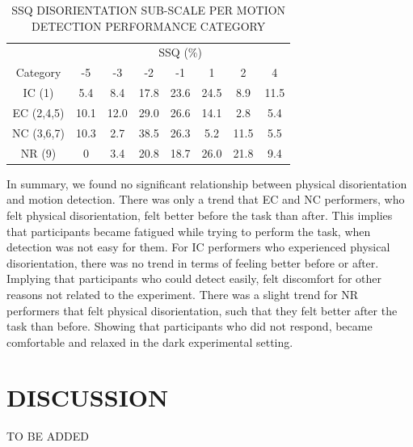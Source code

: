 \documentclass{ieeeaccess}
\begin{document}
\begin{table}[h!]
\caption{SSQ DISORIENTATION SUB-SCALE PER MOTION DETECTION PERFORMANCE CATEGORY}
\label{table3}
\centering
\begin{tabular}{c|ccccccc}
\hline
& \multicolumn{7}{c}{\centering SSQ (\%)}\\
Category & -5 & -3 & -2 & -1 & 1 & 2 & 4\\
\hline
IC (1) & 5.4 & 8.4 & 17.8 & 23.6 & 24.5 & 8.9 & 11.5\\
EC (2,4,5) & 10.1 & 12.0 & 29.0 & 26.6 & 14.1 & 2.8 & 5.4\\
NC (3,6,7) & 10.3 & 2.7 & 38.5 & 26.3 & 5.2 & 11.5 & 5.5\\
NR (9) & 0 & 3.4 & 20.8 & 18.7 & 26.0 & 21.8 & 9.4\\
\hline
\end{tabular}
\end{table}

\indent In summary, we found no significant relationship between physical disorientation and motion detection. There was only a trend that EC and NC performers, who felt physical disorientation, felt better before the task than after. This implies that participants became fatigued while trying to perform the task, when detection was not easy for them. For IC performers who experienced physical disorientation, there was no trend in terms of feeling better before or after. Implying that participants who could detect easily, felt discomfort for other reasons not related to the experiment. There was a slight trend for NR performers that felt physical disorientation, such that they felt better after the task than before. Showing that participants who did not respond, became comfortable and relaxed in the dark experimental setting.


\section{DISCUSSION}

TO BE ADDED




\end{document}
